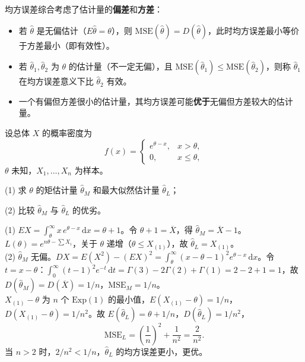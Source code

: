 ﻿\documentclass[lang=cn,11pt]{elegantbook}
\begin{document}
\begin{note}
均方误差综合考虑了估计量的\textbf{偏差}和\textbf{方差}：
\begin{itemize}
    \item 若 \(\hat{\theta}\) 是无偏估计（\(E\hat{\theta}=\theta\)），则 \(\mathrm{MSE}(\hat{\theta}) = D(\hat{\theta})\)，此时均方误差最小等价于方差最小（即有效性）。
    \item 若 \(\hat{\theta}_1, \hat{\theta}_2\) 为 \(\theta\) 的估计量（不一定无偏），且 \(\mathrm{MSE}(\hat{\theta}_1) \leq \mathrm{MSE}(\hat{\theta}_2)\)，则称 \(\hat{\theta}_1\) 在均方误差意义下比 \(\hat{\theta}_2\) 有效。
    \item 一个有偏但方差很小的估计量，其均方误差可能\textbf{优于}无偏但方差较大的估计量。
\end{itemize}
\end{note}


\begin{exercise}\label{exer:7-shifted-exp}
设总体 \(X\) 的概率密度为
\[
f(x) = \begin{cases} e^{\theta-x}, & x > \theta, \\ 0, & x \leq \theta, \end{cases}
\]
\(\theta\) 未知，\(X_1, \dots, X_n\) 为样本。\par
(1) 求 \(\theta\) 的矩估计量 \(\hat{\theta}_M\) 和最大似然估计量 \(\hat{\theta}_L\)；\par
(2) 比较 \(\hat{\theta}_M\) 与 \(\hat{\theta}_L\) 的优劣。
\end{exercise}
\begin{solution}
(1) \(EX = \displaystyle\int_\theta^\infty x\,e^{\theta-x}\,\mathrm{d}x = \theta + 1\)。令 \(\theta+1 = \overline{X}\)，得 \(\hat{\theta}_M = \overline{X}-1\)。
\(L(\theta) = e^{n\theta-\sum X_i}\)，关于 \(\theta\) 递增（\(\theta \leq X_{(1)}\)），故 \(\hat{\theta}_L = X_{(1)}\)。\\
(2) \(\hat{\theta}_M\) 无偏。\(DX = E(X^2)-(EX)^2 = \displaystyle\int_\theta^\infty(x-\theta-1)^2e^{\theta-x}\,\mathrm{d}x\)。令 \(t=x-\theta\)：\(\displaystyle\int_0^\infty(t-1)^2e^{-t}\,\mathrm{d}t = \Gamma(3)-2\Gamma(2)+\Gamma(1) = 2-2+1 = 1\)，故 \(D(\hat{\theta}_M) = D(\overline{X}) = 1/n\)，\(\mathrm{MSE}_M = 1/n\)。\\
\(X_{(1)}-\theta\) 为 \(n\) 个 \(\mathrm{Exp}(1)\) 的最小值，\(E(X_{(1)}-\theta) = 1/n\)，\(D(X_{(1)}-\theta) = 1/n^2\)。故 \(E(\hat{\theta}_L) = \theta + 1/n\)，\(D(\hat{\theta}_L) = 1/n^2\)，
\[
\mathrm{MSE}_L = \left(\frac{1}{n}\right)^{\!2} + \frac{1}{n^2} = \frac{2}{n^2}.
\]
当 \(n > 2\) 时，\(2/n^2 < 1/n\)，\(\hat{\theta}_L\) 的均方误差更小，更优。
\end{solution}
\end{document}
